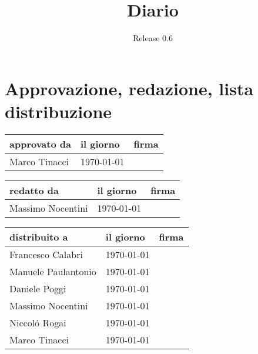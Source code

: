 \documentclass[a4paper, 12pt]{report}
\title{Diario}
\author{Release 0.6}
\date{\today \\Firenze \\\begin{figure}[h] \centering \texttt{[image: ../images/logokiwi.png]} \end{figure} }
\begin{document}
\maketitle

\section*{Approvazione, redazione, lista distribuzione}
\begin{table}[h!]
  \begin{center}
    \begin{tabular}{| l | l | p{60mm} |}
    \hline
    \textbf{approvato da} & \textbf{il giorno} & \textbf{firma} \\
	\hline    
	Marco Tinacci & \today &  \\
    \hline
    \end{tabular}
  \end{center}
\end{table}

\begin{table}[h!]
  \begin{center}
    \begin{tabular}{| l | l | p{60mm} |}
    \hline
    \textbf{redatto da} & \textbf{il giorno} & \textbf{firma} \\
	\hline    
	Massimo Nocentini & \today &  \\
    \hline
    \end{tabular}
  \end{center}
\end{table}

\begin{table}[h!]
  \begin{center}
    \begin{tabular}{| l | l | p{60mm} |}
    \hline
    \textbf{distribuito a} & \textbf{il giorno} & \textbf{firma} \\
	\hline    
	Francesco Calabri & \today &  \\
    \hline
	Manuele Paulantonio & \today &  \\
    \hline
	Daniele Poggi & \today &  \\
    \hline
	Massimo Nocentini & \today &  \\
    \hline
	Niccol\'o Rogai & \today &  \\
    \hline
	Marco Tinacci & \today &  \\
    \hline
    \end{tabular}
  \end{center}
\end{table}
\end{document}
